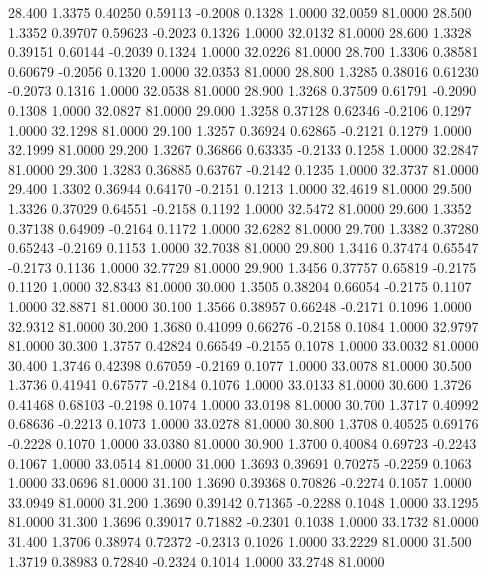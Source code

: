   28.400   1.3375   0.40250   0.59113  -0.2008   0.1328   1.0000  32.0059  81.0000
  28.500   1.3352   0.39707   0.59623  -0.2023   0.1326   1.0000  32.0132  81.0000
  28.600   1.3328   0.39151   0.60144  -0.2039   0.1324   1.0000  32.0226  81.0000
  28.700   1.3306   0.38581   0.60679  -0.2056   0.1320   1.0000  32.0353  81.0000
  28.800   1.3285   0.38016   0.61230  -0.2073   0.1316   1.0000  32.0538  81.0000
  28.900   1.3268   0.37509   0.61791  -0.2090   0.1308   1.0000  32.0827  81.0000
  29.000   1.3258   0.37128   0.62346  -0.2106   0.1297   1.0000  32.1298  81.0000
  29.100   1.3257   0.36924   0.62865  -0.2121   0.1279   1.0000  32.1999  81.0000
  29.200   1.3267   0.36866   0.63335  -0.2133   0.1258   1.0000  32.2847  81.0000
  29.300   1.3283   0.36885   0.63767  -0.2142   0.1235   1.0000  32.3737  81.0000
  29.400   1.3302   0.36944   0.64170  -0.2151   0.1213   1.0000  32.4619  81.0000
  29.500   1.3326   0.37029   0.64551  -0.2158   0.1192   1.0000  32.5472  81.0000
  29.600   1.3352   0.37138   0.64909  -0.2164   0.1172   1.0000  32.6282  81.0000
  29.700   1.3382   0.37280   0.65243  -0.2169   0.1153   1.0000  32.7038  81.0000
  29.800   1.3416   0.37474   0.65547  -0.2173   0.1136   1.0000  32.7729  81.0000
  29.900   1.3456   0.37757   0.65819  -0.2175   0.1120   1.0000  32.8343  81.0000
  30.000   1.3505   0.38204   0.66054  -0.2175   0.1107   1.0000  32.8871  81.0000
  30.100   1.3566   0.38957   0.66248  -0.2171   0.1096   1.0000  32.9312  81.0000
  30.200   1.3680   0.41099   0.66276  -0.2158   0.1084   1.0000  32.9797  81.0000
  30.300   1.3757   0.42824   0.66549  -0.2155   0.1078   1.0000  33.0032  81.0000
  30.400   1.3746   0.42398   0.67059  -0.2169   0.1077   1.0000  33.0078  81.0000
  30.500   1.3736   0.41941   0.67577  -0.2184   0.1076   1.0000  33.0133  81.0000
  30.600   1.3726   0.41468   0.68103  -0.2198   0.1074   1.0000  33.0198  81.0000
  30.700   1.3717   0.40992   0.68636  -0.2213   0.1073   1.0000  33.0278  81.0000
  30.800   1.3708   0.40525   0.69176  -0.2228   0.1070   1.0000  33.0380  81.0000
  30.900   1.3700   0.40084   0.69723  -0.2243   0.1067   1.0000  33.0514  81.0000
  31.000   1.3693   0.39691   0.70275  -0.2259   0.1063   1.0000  33.0696  81.0000
  31.100   1.3690   0.39368   0.70826  -0.2274   0.1057   1.0000  33.0949  81.0000
  31.200   1.3690   0.39142   0.71365  -0.2288   0.1048   1.0000  33.1295  81.0000
  31.300   1.3696   0.39017   0.71882  -0.2301   0.1038   1.0000  33.1732  81.0000
  31.400   1.3706   0.38974   0.72372  -0.2313   0.1026   1.0000  33.2229  81.0000
  31.500   1.3719   0.38983   0.72840  -0.2324   0.1014   1.0000  33.2748  81.0000
